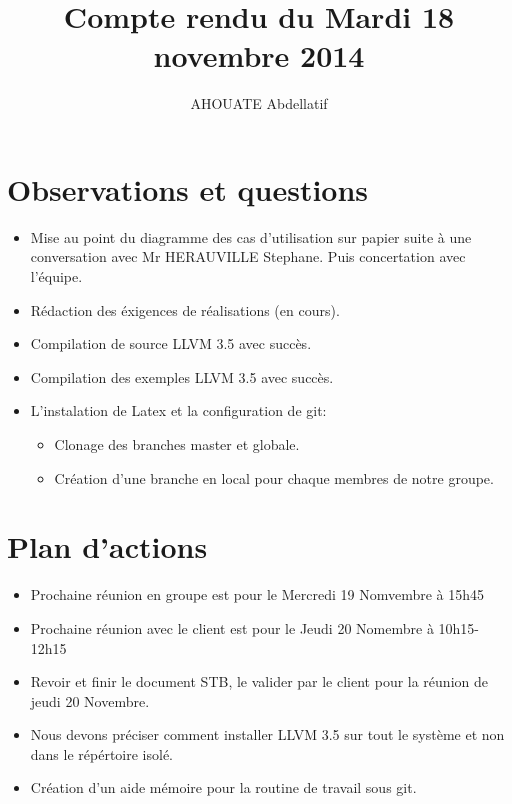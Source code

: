 \documentclass{../../../../../res/rapport}
\author{AHOUATE Abdellatif}
\title{Compte rendu du Mardi 18 novembre 2014}
\begin{document}
    \maketitle
    \tableofcontents
    \clearpage
    
    \section{Observations et questions} 
    \label{sec:observations_et_questions}
        \begin{itemize}
            \item Mise au point du diagramme des cas d’utilisation sur papier 
            suite à une conversation avec Mr HERAUVILLE Stephane. 
            Puis concertation avec l'équipe.\\

            \item Rédaction des éxigences de réalisations (en cours).\\

            \item Compilation de source LLVM 3.5 avec succès.\\
            \item Compilation des exemples LLVM 3.5 avec succès.\\

            \item  L'instalation de Latex et la configuration de git:
                \begin{itemize}
                    \item Clonage des branches master et globale.
                    \item Création d'une branche en local pour chaque membres
                          de notre groupe.         
                \end{itemize}
            
        \end{itemize}
        
    \section{Plan d'actions} 
    \label{sec:plan_d_actions}
        \begin{itemize}
            \item Prochaine réunion en groupe est pour le Mercredi 19 Nomvembre
                   à 15h45
            \item Prochaine réunion avec le client est pour le Jeudi 20 Nomembre
                  à 10h15-12h15 
            \item Revoir et finir le document STB, le valider par le client pour
                  la réunion de jeudi 20 Novembre.
            \item Nous devons préciser comment installer LLVM 3.5 sur tout le 
                  système et non dans le répértoire isolé.
            \item Création d'un aide mémoire pour la routine de travail sous
                  git.
        \end{itemize}
        
\end{document}
